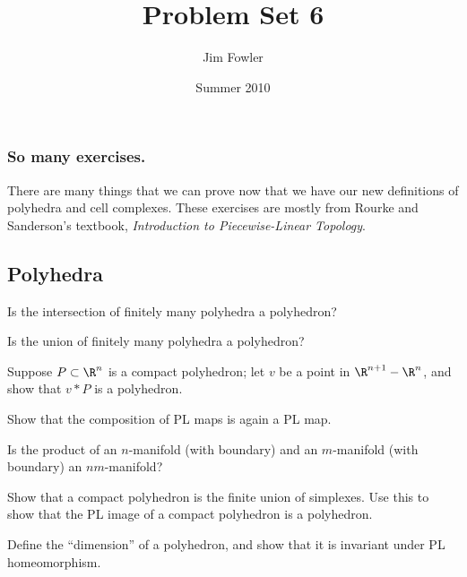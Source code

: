 \documentclass[12pt]{pset}
\title{Problem Set 6}
\author{Jim Fowler}
\date{Summer 2010}
\newcommand{\join}{\ast}
\begin{document}
\maketitle

\subsubsection*{So many exercises.} There are many things that we can
prove now that we have our new definitions of polyhedra and cell
complexes.  These exercises are mostly from Rourke and Sanderson's
textbook, \textit{Introduction to Piecewise-Linear Topology}.

\baselineskip
\parindent 0pt

\subsection*{Polyhedra}

\begin{problem}
  Is the intersection of finitely many polyhedra a polyhedron?
\end{problem}

\begin{problem}
  Is the union of finitely many polyhedra a polyhedron?
\end{problem}

\begin{problem}
  Suppose $P \subset \R^n$ is a compact polyhedron; let $v$ be a point in
  $\R^{n+1} - \R^n$, and show that $v \join P$ is a polyhedron.
\end{problem}

\begin{requiredproblem}
  Show that the composition of PL maps is again a PL map.
\end{requiredproblem}

\begin{requiredproblem}
  Is the product of an $n$-manifold (with boundary) and an
  $m$-manifold (with boundary) an $nm$-manifold?
\end{requiredproblem}

\begin{problem}
  Show that a compact polyhedron is the finite union of simplexes.
  Use this to show that the PL image of a compact polyhedron is a
  polyhedron.
\end{problem}

\begin{problem}
  Define the ``dimension'' of a polyhedron, and show that it is
  invariant under PL homeomorphism.
\end{problem}
\end{document}

